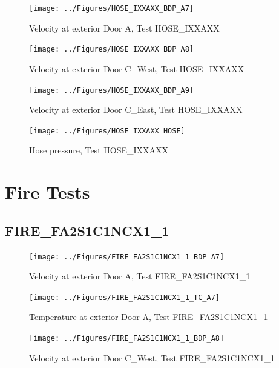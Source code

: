 \documentclass[11pt,oneside]{book}
\begin{document}
\begin{figure}[!ht]
\texttt{[image: ../Figures/HOSE\_IXXAXX\_BDP\_A7]}
\caption{Velocity at exterior Door A, Test HOSE\_IXXAXX}
\label{fig:HOSE_IXXAXX_BDP_A7}
\end{figure}

\begin{figure}[!ht]
\texttt{[image: ../Figures/HOSE\_IXXAXX\_BDP\_A8]}
\caption{Velocity at exterior Door C\_West, Test HOSE\_IXXAXX}
\label{fig:HOSE_IXXAXX_BDP_A8}
\end{figure}

\begin{figure}[!ht]
\texttt{[image: ../Figures/HOSE\_IXXAXX\_BDP\_A9]}
\caption{Velocity at exterior Door C\_East, Test HOSE\_IXXAXX}
\label{fig:HOSE_IXXAXX_BDP_A9}
\end{figure}

\begin{figure}[!ht]
\texttt{[image: ../Figures/HOSE\_IXXAXX\_HOSE]}
\caption{Hose pressure, Test HOSE\_IXXAXX}
\label{fig:HOSE_IXXAXX_HOSE}
\end{figure}


\clearpage


\section{Fire Tests}

\subsection{FIRE\_FA2S1C1NCX1\_1}

\begin{figure}[!ht]
\texttt{[image: ../Figures/FIRE\_FA2S1C1NCX1\_1\_BDP\_A7]}
\caption{Velocity at exterior Door A, Test FIRE\_FA2S1C1NCX1\_1}
\label{fig:FIRE_FA2S1C1NCX1_1_BDP_A7}
\end{figure}

\begin{figure}[!ht]
\texttt{[image: ../Figures/FIRE\_FA2S1C1NCX1\_1\_TC\_A7]}
\caption{Temperature at exterior Door A, Test FIRE\_FA2S1C1NCX1\_1}
\label{fig:FIRE_FA2S1C1NCX1_1_TC_A7}
\end{figure}

\begin{figure}[!ht]
\texttt{[image: ../Figures/FIRE\_FA2S1C1NCX1\_1\_BDP\_A8]}
\caption{Velocity at exterior Door C\_West, Test FIRE\_FA2S1C1NCX1\_1}
\label{fig:FIRE_FA2S1C1NCX1_1_BDP_A8}
\end{figure}
\end{document}
